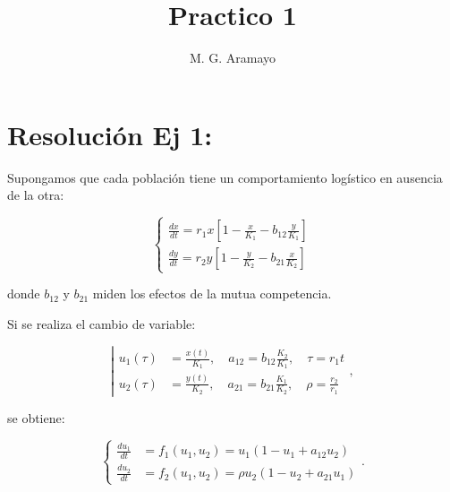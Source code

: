 \documentclass[twocolumn,aps,prl]{revtex4-1}
\begin{document}

\title{Practico 1}
\author{M. G. Aramayo}


\maketitle



\section{Resolución Ej 1:}

Supongamos que cada población tiene un comportamiento logístico en ausencia de la otra:

$$
\left\{
\begin{aligned}
    \frac{d x}{d t}=r_{1} x\left[1-\frac{x}{K_{1}}-b_{12} \frac{y}{K_{1}}\right] \\
    \frac{d y}{d t}=r_{2} y\left[1-\frac{y}{K_{2}}-b_{21} \frac{x}{K_{2}}\right]
\end{aligned}
\right.
$$

donde $b_{12}$ y $b_{21}$ miden los efectos de la mutua competencia. 

Si se realiza el cambio de variable:

\begin{equation} \label{eq:cambio de variable}
\left\lvert 
    \begin{aligned}
    u_1(\tau) &= \frac{x(t)}{K_{1}}, \quad a_{12} = b_{12} \frac{K_{2}}{K_{1}}, \quad \tau=r_{1} t \\
    u_2(\tau) &= \frac{y(t)}{K_{2}}, \quad a_{21} = b_{21} \frac{K_{1}}{K_{2}}, \quad \rho=\frac{r_{2}}{r_{1}}
    \end{aligned}
\right. ,
\end{equation}

se obtiene:

\begin{equation} \label{eq:adimenzionalizada}
\left\{
\begin{aligned}
    \frac{d u_{1}}{d t} &= f_{1}\left(u_{1}, u_{2}\right) = u_{1}\left(1-u_{1}+a_{12} u_{2}\right) \\
    \frac{d u_{2}}{d t} &= f_{2}\left(u_{1}, u_{2}\right) = \rho u_{2}\left(1-u_{2}+a_{21} u_{1}\right)
\end{aligned}
\right.  .  
\end{equation}
\end{document}
